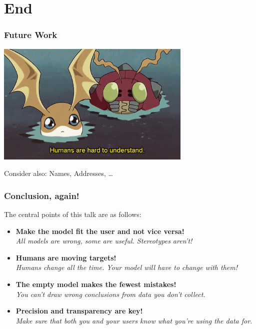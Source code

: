 \documentclass[aspectratio=169,x11names]{beamer}
\begin{document}
\section{End}

\begin{frame}
\frametitle{Future Work}

\begin{center}
\includegraphics[width=0.7\textwidth,keepaspectratio]{images/humans.png} 
\large\medskip

Consider also: Names, Addresses, \dots
\end{center}
\end{frame}

\begin{frame}
\frametitle{Conclusion, again!}
\large
The central points of this talk are as follows:\bigskip

\begin{itemize}
\item \textbf{Make the model fit the user and not vice versa!}\\
\emph{All models are wrong, some are useful. Stereotypes aren't!}\medskip
\item \textbf{Humans are moving targets!}\\
\emph{Humans change all the time. Your model will have to change with them!}\medskip
\item \textbf{The empty model makes the fewest mistakes!}\\
\emph{You can't draw wrong conclusions from data you don't collect.}\medskip
\item \textbf{Precision and transparency are key!}\\
\emph{Make sure that both you and your users know what you're using the data for.}
\end{itemize}

\end{frame}
\end{document}
